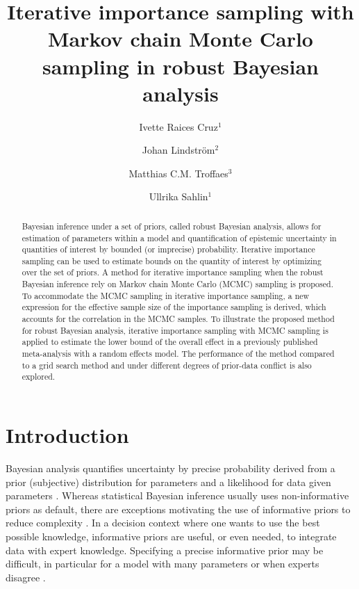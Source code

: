 \documentclass{amsart}
\theoremstyle{plain}%
\begin{document}
\title[Iterative importance sampling with Markov chain Monte Carlo sampling]{Iterative importance sampling with Markov chain Monte Carlo sampling in robust Bayesian analysis}

\author{Ivette Raices Cruz$^1$}
\address{$^1$Centre for Environmental and Climate Science, Lund University, Lund, Sweden}

\author{Johan Lindstr{\"o}m$^2$}
\address{$^2$Centre for Mathematical Sciences, Lund University, Lund, Sweden}

\author{Matthias C.M. Troffaes$^3$}
\address{$^3$Durham University, Department of Mathematical Sciences, UK}

\author{Ullrika Sahlin$^1$}

\begin{abstract}
Bayesian inference under a set of priors, called robust Bayesian analysis, allows for estimation of parameters within a model and quantification of epistemic uncertainty in quantities of interest by bounded (or imprecise) probability. 
Iterative importance sampling can be used to estimate bounds
on the quantity of interest by optimizing over the set of priors. 
A method for iterative importance sampling when the robust Bayesian inference rely on Markov chain Monte Carlo (MCMC) sampling is proposed.
To accommodate the MCMC sampling in iterative importance sampling, a new expression for the effective sample size of the importance sampling is derived, which accounts for the correlation in the MCMC samples. 
To illustrate the proposed method for robust Bayesian analysis, iterative importance sampling with MCMC sampling is applied to estimate the lower bound of the overall effect in a previously published meta-analysis with a random effects model. 
The performance of the method compared to a grid search method and under different degrees of prior-data conflict is also explored.
\end{abstract}

\maketitle

\section{Introduction}

Bayesian analysis quantifies uncertainty by precise probability derived from a prior (subjective) distribution for parameters and a 
likelihood for data given parameters \citep{Gelman_2013}. 
Whereas statistical Bayesian inference usually uses non-informative priors as default, there are exceptions motivating the use of informative priors to reduce complexity \citep{Simpson_2017}. In a decision context where one wants to use the best possible knowledge, informative priors are
useful, or even needed, to integrate data with expert knowledge. Specifying a precise informative prior may be difficult, in particular for a model with many parameters or when experts disagree \citep{Rinderknecht_2012, Insua_2000}.
\end{document}
